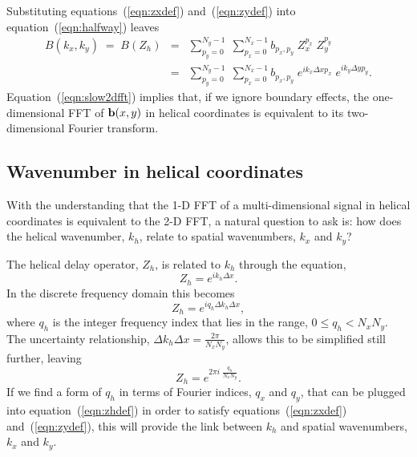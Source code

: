 \par
Substituting equations~(\ref{eqn:zxdef}) and~(\ref{eqn:zydef}) into
equation~(\ref{eqn:halfway}) leaves 
\begin{eqnarray}
B(k_x,k_y) \; = \; B(Z_h) 
& = & \sum_{p_y=0}^{N_y-1} \; \sum_{p_x=0}^{N_x-1}
b_{p_x,p_y} \; Z_x^{p_x} \; Z_y^{p_y} \\
& = & \sum_{p_y=0}^{N_y-1} \; \sum_{p_x=0}^{N_x-1}
b_{p_x,p_y} \; e^{i k_x \Delta x p_x} \; 
e^{i k_y \Delta y p_y}. \label{eqn:slow2dfft}
\end{eqnarray}
Equation~(\ref{eqn:slow2dfft}) implies that, if we ignore boundary 
effects, the one-dimensional FFT of ${\bf b}(x,y)$ in helical
coordinates is equivalent to its two-dimensional Fourier transform. 

\subsection{Wavenumber in helical coordinates}
With the understanding that the 1-D FFT of a multi-dimensional signal
in helical coordinates is equivalent to the 2-D FFT, a natural
question to ask is: how does the helical wavenumber, $k_h$, relate to
spatial wavenumbers, $k_x$ and $k_y$?

\par
The helical delay operator, $Z_h$, is related to $k_h$ 
through the equation,
\begin{equation}
Z_h = e^{i k_h \Delta x}.
\end{equation}
In the discrete frequency domain this becomes
\begin{equation}
Z_h = e^{i q_h \Delta k_h \Delta x},
\end{equation}
where $q_h$ is the integer frequency index that lies in the range, 
$0 \leq q_h < N_x N_y$. 
The uncertainty relationship, 
$\Delta k_h \Delta x = \frac{2 \pi}{N_x N_y}$, allows this to be
simplified still further, leaving
\begin{equation} \label{eqn:zhdef}
Z_h = e^{2 \pi i \; \frac{q_h}{N_x N_y}}.
\end{equation}
If we find a form of $q_h$ in terms of Fourier indices,
$q_x$ and $q_y$, that can be plugged into equation~(\ref{eqn:zhdef})
in order to satisfy equations~(\ref{eqn:zxdef})
and~(\ref{eqn:zydef}), this will provide the link between $k_h$ and
spatial wavenumbers, $k_x$ and $k_y$.

